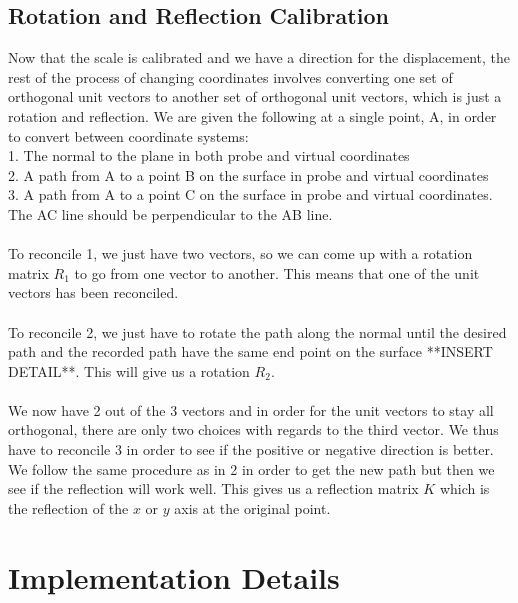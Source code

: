 \documentclass[conference]{acmsiggraph}
\begin{document}
\subsection{Rotation and Reflection Calibration}

Now that the scale is calibrated and we have a direction for the displacement, the rest of the process of changing coordinates involves converting one set of orthogonal unit vectors to another set of orthogonal unit vectors, which is just a rotation and reflection. We are given the following at a single point, A, in order to convert between coordinate systems:\\
1. The normal to the plane in both probe and virtual coordinates\\
2. A path from A to a point B on the surface in probe and virtual coordinates\\
3. A path from A to a point C on the surface in probe and virtual coordinates. The AC line should be perpendicular to the AB line. \\
\\
To reconcile 1, we just have two vectors, so we can come up with a rotation matrix $R_1$ to go from one vector to another. This means that one of the unit vectors has been reconciled. \\
\\
To reconcile 2, we just have to rotate the path along the normal until the desired path and the recorded path have the same end point on the surface **INSERT DETAIL**. This will give us a rotation $R_2$. \\
\\
We now have 2 out of the 3 vectors and in order for the unit vectors to stay all orthogonal, there are only two choices with regards to the third vector. We thus have to reconcile 3 in order to see if the positive or negative direction is better. We follow the same procedure as in 2 in order to get the new path but then we see if the reflection will work well. This gives us a reflection matrix $K$ which is the reflection of the $x$ or $y$ axis at the original point.

\section{Implementation Details}
\end{document}
